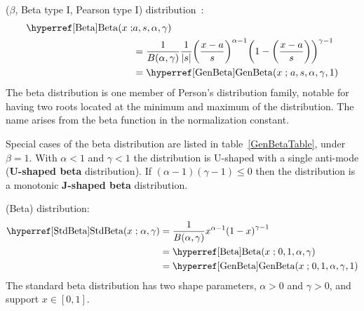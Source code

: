 

\label{sec:Beta}




 ($\beta$, Beta type I, Pearson type I) distribution~\cite{Pearson1895}:
\begin{align}
\label{Beta}
\opr{Beta}(x\given &a,s,\alpha, \gamma) \\
& = 
 \frac{1}{B(\alpha, \gamma)}\frac{1}{ \Left|s\Right|}
\Left(\frac{x-a}{s} \Right)^{\alpha -1} \Left (1-\Left(\frac{x-a}{s}\Right)\Right)^{\gamma -1}	\checked
\notag
\\ & = \opr{GenBeta}(x\given a,s,\alpha, \gamma,1) \notag						\checked
\end{align}
The beta distribution is one member of Person's distribution family, notable for having two roots located at the minimum and maximum of the distribution. The name arises from the beta function in the normalization constant.





Special cases of the beta  distribution are listed in table~\ref{GenBetaTable}, under $\beta=1$.
With $\alpha<1$ and $\gamma<1$ the distribution is U-shaped with a single anti-mode ({\bf U-shaped beta} distribution). If $(\alpha-1)(\gamma-1)\leq 0$ then the distribution is a  monotonic {\bf J-shaped beta} distribution. 


 (Beta) distribution: 
\begin{align}
\label{StdBeta}
\opr{StdBeta}(x\given \alpha, \gamma) &= 
 \frac{1}{B(\alpha, \gamma)} 
x^{\alpha-1} \Left (1- x\Right)^{\gamma -1}								\checked
\\ & = \opr{Beta}(x\given  0,1,\alpha,\gamma) \notag						\checked
\\ & = \opr{GenBeta}(x\given  0,1,\alpha,\gamma, 1) \notag				\checked
\end{align}
The standard beta distribution has two shape parameters, $\alpha>0$ and $\gamma>0$, and support $x\in[0,1]$. 


